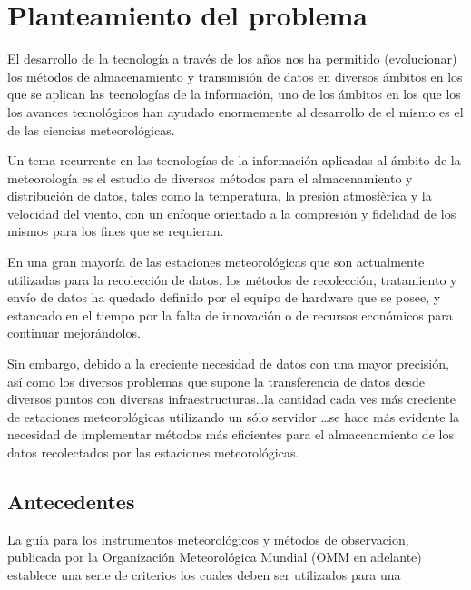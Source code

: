 \section{Planteamiento del problema}

El desarrollo de la tecnología a través de los años nos ha permitido (evolucionar) los métodos de almacenamiento y transmisión de datos en diversos ámbitos en los que se aplican las tecnologías de la información, uno de los ámbitos en los que los los avances tecnológicos han ayudado enormemente al desarrollo de el mismo es el de las ciencias meteorológicas.

Un tema recurrente en las tecnologías de la información aplicadas al ámbito de la meteorología es el estudio de diversos métodos para el almacenamiento y distribución de datos, tales como la temperatura, la presión atmosfèrica y la velocidad del viento, con un enfoque orientado a la compresión y fidelidad de los mismos para los fines que se requieran.

En una gran mayoría de las estaciones meteorológicas que son actualmente utilizadas para la recolección de datos, los métodos de recolección, tratamiento y envío de datos ha quedado definido por el equipo de hardware que se posee, y estancado en el tiempo por la falta de innovación o de recursos económicos para continuar mejorándolos.

Sin embargo, debido a la creciente necesidad de datos con una mayor precisión, así como los diversos problemas que supone la transferencia de datos desde diversos puntos con diversas infraestructuras\dots la cantidad cada ves más creciente de estaciones meteorológicas utilizando un sólo servidor \dots se hace más evidente la necesidad de implementar métodos más eficientes para el almacenamiento de los datos recolectados por las estaciones meteorológicas.

\subsection{Antecedentes}

La guía para los instrumentos meteorológicos y métodos de observacion, publicada por la Organización Meteorológica Mundial (OMM en adelante) establece una serie de criterios los cuales deben ser utilizados para una \cite{CIMO_2008}

